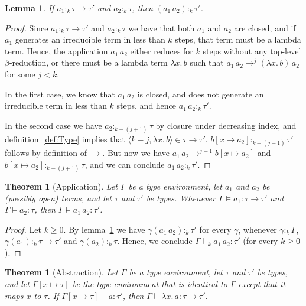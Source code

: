 \documentclass[12pt,a4paper,draft]{article}
\theoremstyle{definition}
\theoremstyle{plain}
\newtheorem{lemma}[definition]{Lemma}
\newtheorem{theorem}[definition]{Theorem}
\newcommand{\abstr}[2]{\ensuremath{\lambda{#1}.\,{#2}}}
\newcommand{\app}[2]{\ensuremath{{#1}\,{#2}}}
\newcommand{\pair}[1]{\ensuremath{\langle{#1}\rangle}}
\begin{document}
\begin{lemma} \label{lem:Application}
  If $a_1 :_k \tau \to \tau'$ and $a_2 :_k \tau$, then $(\app{a_1}{a_2}) :_k \tau'$.
\end{lemma}

\begin{proof}
  Since $a_1 :_k \tau \to \tau'$ and $a_2 :_k \tau$ we have that both $a_1$ and $a_2$ are closed,
  and if $a_1$ generates an irreducible term in less than $k$ steps, that term must be a lambda
  term. Hence, the application $\app{a_1}{a_2}$ either reduces for $k$ steps without any top-level
  $\beta$-reduction, or there must be a lambda term $\abstr{x}{b}$ such that
  $\app{a_1}{a_2} \to^j \app{(\abstr{x}{b})}{a_2}$ for some $j < k$.

  In the first case, we know that $\app{a_1}{a_2}$ is closed, and does not generate an irreducible
  term in less than $k$ steps, and hence $\app{a_1}{a_2} :_k \tau'$.

  In the second case we have $a_2 :_{k-(j+1)} \tau$ by closure under decreasing index, and
  definition~\ref{def:Type} implies that $\pair{k-j,\abstr{x}{b}} \in \tau \to \tau'$.
  $b[x \mapsto a_2] :_{k-(j+1)} \tau'$ follows by definition of $\to$. But now we have
  $\app{a_1}{a_2} \to^{j+1} b[x \mapsto a_2]$ and $b[x \mapsto a_2] :_{k-(j+1)} \tau$, and
  we can conclude $\app{a_1}{a_2} :_k \tau'$.
\end{proof}

\begin{theorem}[Application] \label{thm:Application}
  Let $\Gamma$ be a type environment, let $a_1$ and $a_2$ be (possibly open) terms, and let
  $\tau$ and $\tau'$ be types. Whenever $\Gamma \models a_1 : \tau \to \tau'$ and $\Gamma \models a_2 : \tau$,
  then $\Gamma \models \app{a_1}{a_2} : \tau'$.
\end{theorem}

\begin{proof}
  Let $k \ge 0$. By lemma~\ref{lem:Application} we have
  $\gamma(\app{a_1}{a_2}) :_k \tau'$ for every $\gamma$, whenever $\gamma :_k \Gamma$,
  $\gamma(a_1) :_k \tau \to \tau'$ and $\gamma(a_2) :_k \tau$. Hence, we conclude
  $\Gamma \models_k \app{a_1}{a_2} : \tau'$ (for every $k \ge 0$).
\end{proof}

\begin{theorem}[Abstraction] \label{thm:Abstraction}
  Let $\Gamma$ be a type environment, let $\tau$ and $\tau'$ be types, and let $\Gamma[x \mapsto \tau]$
  be the type environment that is identical to $\Gamma$ except that it maps $x$ to $\tau$. If
  $\Gamma[x \mapsto \tau] \models a : \tau'$, then $\Gamma \models \abstr{x}{a} : \tau \to \tau'$.
\end{theorem}
\end{document}
